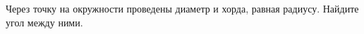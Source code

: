 \begin{ex}
	\begin{condition}
		Через точку на окружности проведены диаметр и хорда, равная радиусу. Найдите угол между ними.
	\end{condition}
	\answer{\( 60\degree \)}
\end{ex}